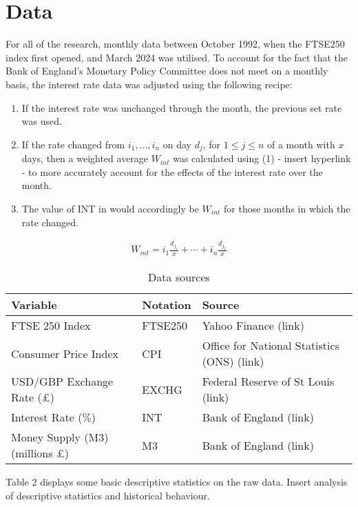 \documentclass[12pt,a4paper]{article}
\begin{document}
\section{Data}

For all of the research, monthly data between October 1992, when the FTSE250 index first opened, and March 2024 was utilised. 
To account for the fact that the Bank of England’s Monetary Policy Committee does not meet on a monthly basis, the interest rate data was 
adjusted using the following recipe:
\begin{enumerate}
    \item If the interest rate was unchanged through the month, the previous set rate was used.
    \item If the rate changed from $i_1,\ldots,i_n$ on day $d_j$, for $1\leq j\leq n$ of a month with $x$ days, then a weighted average $W_{int}$ was calculated using (1) - insert hyperlink - to more accurately account for the effects of the interest rate over the month. 
    \item The value of INT in would accordingly be $W_{int}$ for those months in which the rate changed. 
\end{enumerate}

\begin{align}
    W_{int} = i_1 \frac{d_{j_1}}{x} + \cdots +i_n\frac{d_{j_2}}{x}
\end{align}

\begin{table}[h!]
    \centering
    \caption{Data sources}
    \begin{tabular}{lll}
        \toprule
        \textbf{Variable} & \textbf{Notation} & \textbf{Source} \\
        \midrule
        FTSE 250 Index & FTSE250 & Yahoo Finance (link) \\
        Consumer Price Index & CPI & Office for National Statistics (ONS) (link) \\
        USD/GBP Exchange Rate (£) & EXCHG & Federal Reserve of St Louis (link)\\
        Interest Rate ($\%$) & INT & Bank of England (link) \\
        Money Supply (M3) (millions £) & M3 & Bank of England (link) \\
        \bottomrule
    \end{tabular}
\end{table}

Table 2 displays some basic descriptive statistics on the raw data. Insert analysis of descriptive statistics and historical behaviour.
\end{document}
